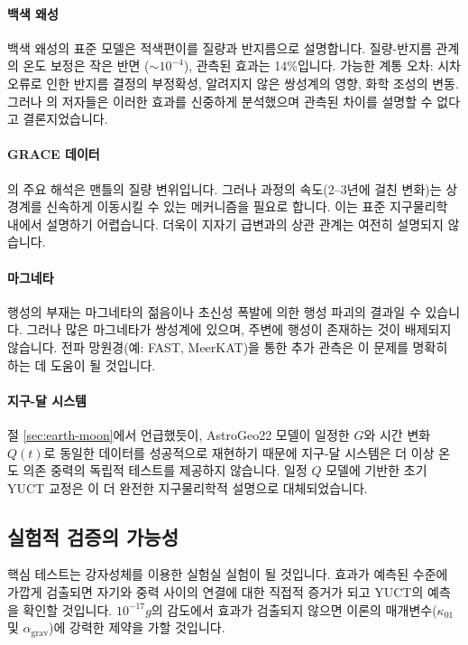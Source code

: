 \documentclass[11pt,a4paper]{article}
\begin{document}
	\paragraph{백색 왜성}
	백색 왜성의 표준 모델은 적색편이를 질량과 반지름으로 설명합니다. 질량-반지름 관계의 온도 보정은 작은 반면 ($\sim 10^{-4}$), 관측된 효과는 14\%입니다. 가능한 계통 오차: 시차 오류로 인한 반지름 결정의 부정확성, 알려지지 않은 쌍성계의 영향, 화학 조성의 변동. 그러나 \cite{Crumpler2024}의 저자들은 이러한 효과를 신중하게 분석했으며 관측된 차이를 설명할 수 없다고 결론지었습니다.
	
	\paragraph{GRACE 데이터}
	\cite{Rosat2025}의 주요 해석은 맨틀의 질량 변위입니다. 그러나 과정의 속도(2–3년에 걸친 변화)는 상 경계를 신속하게 이동시킬 수 있는 메커니즘을 필요로 합니다. 이는 표준 지구물리학 내에서 설명하기 어렵습니다. 더욱이 지자기 급변과의 상관 관계는 여전히 설명되지 않습니다.
	
	\paragraph{마그네타}
	행성의 부재는 마그네타의 젊음이나 초신성 폭발에 의한 행성 파괴의 결과일 수 있습니다. 그러나 많은 마그네타가 쌍성계에 있으며, 주변에 행성이 존재하는 것이 배제되지 않습니다. 전파 망원경(예: FAST, MeerKAT)을 통한 추가 관측은 이 문제를 명확히 하는 데 도움이 될 것입니다.
	
	\paragraph{지구-달 시스템}
	절 \ref{sec:earth-moon}에서 언급했듯이, AstroGeo22 모델이 일정한 $G$와 시간 변화 $Q(t)$로 동일한 데이터를 성공적으로 재현하기 때문에 지구-달 시스템은 더 이상 온도 의존 중력의 독립적 테스트를 제공하지 않습니다. 일정 $Q$ 모델에 기반한 초기 YUCT 교정은 이 더 완전한 지구물리학적 설명으로 대체되었습니다.
	
	\subsection{실험적 검증의 가능성}
	\label{subsec:discussion-experiment}
	
	핵심 테스트는 강자성체를 이용한 실험실 실험이 될 것입니다. 효과가 예측된 수준에 가깝게 검출되면 자기와 중력 사이의 연결에 대한 직접적 증거가 되고 YUCT의 예측을 확인할 것입니다. $10^{-17}g$의 감도에서 효과가 검출되지 않으면 이론의 매개변수($\kappa_{01}$ 및 $\alpha_{\text{grav}}$)에 강력한 제약을 가할 것입니다.
	
\end{document}
